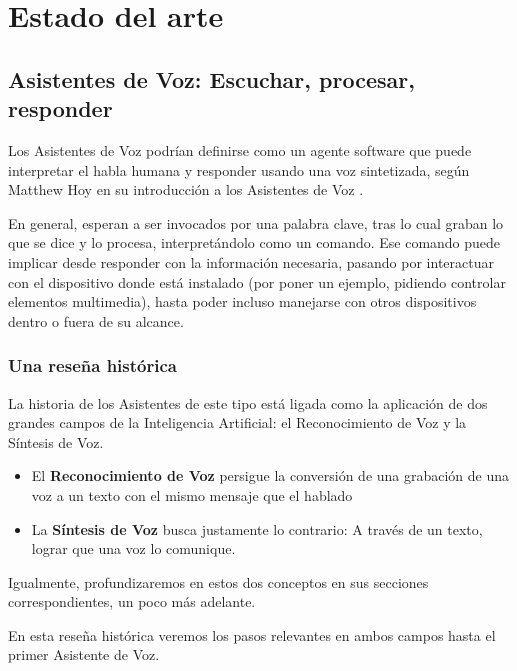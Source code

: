 \chapter{Estado del arte}

\noindent{}

\section{Asistentes de Voz: Escuchar, procesar, responder}

Los Asistentes de Voz podrían definirse como un agente software que puede interpretar el habla humana y responder usando una voz sintetizada, según Matthew Hoy en su introducción a los Asistentes de Voz \cite{vaintroduction-matthewhoy}. 

En general, esperan a ser invocados por una palabra clave, tras lo cual graban lo que se dice y lo procesa, interpretándolo como un comando. Ese comando puede implicar desde responder con la información necesaria, pasando por interactuar con el dispositivo donde está instalado (por poner un ejemplo, pidiendo controlar elementos multimedia), hasta poder incluso manejarse con otros dispositivos dentro o fuera de su alcance.

\subsection{Una reseña histórica}
La historia de los Asistentes de este tipo está ligada como la aplicación de dos grandes campos de la Inteligencia Artificial: el Reconocimiento de Voz y la Síntesis de Voz.
\begin{itemize}
	\item El \textbf{Reconocimiento de Voz} persigue la conversión de una grabación de una voz a un texto con el mismo mensaje que el hablado
	\item La \textbf{Síntesis de Voz} busca justamente lo contrario: A través de un texto, lograr que una voz lo comunique.
\end{itemize}

Igualmente, profundizaremos en estos dos conceptos en sus secciones correspondientes, un poco más adelante.

En esta reseña histórica veremos los pasos relevantes en ambos campos hasta el primer Asistente de Voz.

